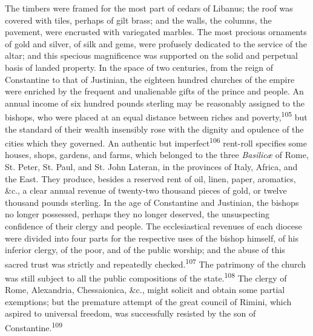 The timbers were framed for the most part of cedars of Libanus; the
roof was covered with tiles, perhaps of gilt brass; and the walls, the
columns, the pavement, were encrusted with variegated marbles. The most
precious ornaments of gold and silver, of silk and gems, were profusely
dedicated to the service of the altar; and this specious magnificence
was supported on the solid and perpetual basis of landed property. In
the space of two centuries, from the reign of Constantine to that of
Justinian, the eighteen hundred churches of the empire were enriched by
the frequent and unalienable gifts of the prince and people. An annual
income of six hundred pounds sterling may be reasonably assigned to the
bishops, who were placed at an equal distance between riches and
poverty,\textsuperscript{105} but the standard of their wealth insensibly rose with the
dignity and opulence of the cities which they governed. An authentic
but imperfect\textsuperscript{106} rent-roll specifies some houses, shops, gardens, and
farms, which belonged to the three \textit{Basilicæ} of Rome, St. Peter, St.
Paul, and St. John Lateran, in the provinces of Italy, Africa, and the
East. They produce, besides a reserved rent of oil, linen, paper,
aromatics, \&c., a clear annual revenue of twenty-two thousand pieces of
gold, or twelve thousand pounds sterling. In the age of Constantine and
Justinian, the bishops no longer possessed, perhaps they no longer
deserved, the unsuspecting confidence of their clergy and people. The
ecclesiastical revenues of each diocese were divided into four parts
for the respective uses of the bishop himself, of his inferior clergy,
of the poor, and of the public worship; and the abuse of this sacred
trust was strictly and repeatedly checked.\textsuperscript{107} The patrimony of the
church was still subject to all the public compositions of the state.\textsuperscript{108}
The clergy of Rome, Alexandria, Chessaionica, \&c., might solicit
and obtain some partial exemptions; but the premature attempt of the
great council of Rimini, which aspired to universal freedom, was
successfully resisted by the son of Constantine.\textsuperscript{109}




